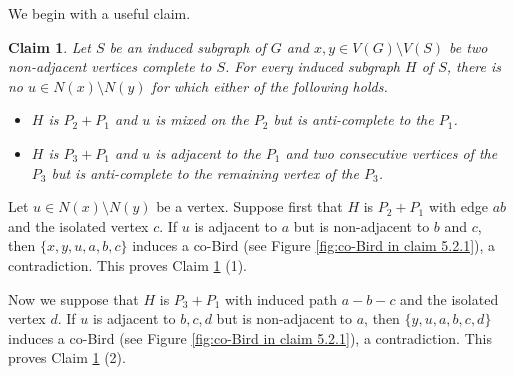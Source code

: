 \documentclass[a4paper,11pt]{article}
\newtheorem{claim}{Claim}[theorem]
\let\oldendproof\endproof
\renewenvironment{proof}[1][\proofname]{%
	\oldproof[\normalfont\bfseries #1]%
}{\oldendproof}
\renewcommand{\qedsymbol}{$\square$}%
\newenvironment{subproof}[1][\normalfont\it Subproof]{%
	\renewcommand{\qedsymbol}{{\tiny{$\blacksquare$}}}%
	\begin{proof}[#1]%
	}{%
	\end{proof}%
}
\begin{document}
    \begin{proof}
        We begin with a useful claim. 
        \begin{claim}\label{clm:a vertex mixed on a path via bird}
            Let $S$ be an induced subgraph of $G$ and $x,y\in V(G)\setminus V(S)$ be two non-adjacent vertices complete to $S$. 
            For every induced subgraph $H$ of $S$, there is no $u\in N(x)\setminus N(y)$ for which either of the following holds. 
            \begin{itemize}
                \item[$(1)$] $H$ is $P_2+P_1$ and $u$ is mixed on the $P_2$ but is anti-complete to the $P_1$.  
                \item[$(2)$] $H$ is $P_3+P_1$ and $u$ is adjacent to the $P_1$ and two consecutive vertices of the $P_3$ but is anti-complete to the remaining vertex of the $P_3$.  
            \end{itemize} 
        \end{claim}
        
        \begin{subproof}[Proof of Claim \ref{clm:a vertex mixed on a path via bird}]
            Let $u\in N(x)\setminus N(y)$ be a vertex. 
            Suppose first that $H$ is $P_2+P_1$ with edge $ab$ and the isolated vertex $c$. 
            If $u$ is adjacent to $a$ but is non-adjacent to $b$ and $c$, then $\{x,y,u,a,b,c\}$ induces a co-Bird (see Figure \ref{fig:co-Bird in claim 5.2.1}), a contradiction. 
            This proves Claim \ref{clm:a vertex mixed on a path via bird} (1). 

            Now we suppose that $H$ is $P_3+P_1$ with induced path $a-b-c$ and the isolated vertex $d$. 
            If $u$ is adjacent to $b,c,d$ but is non-adjacent to $a$, then $\{y,u,a,b,c,d\}$ induces a co-Bird (see Figure \ref{fig:co-Bird in claim 5.2.1}), a contradiction. 
            This proves Claim \ref{clm:a vertex mixed on a path via bird} (2). 
        \end{subproof}
        
        \begin{figure}[h!]
        \centering
\end{figure}
\end{proof}
\end{document}
